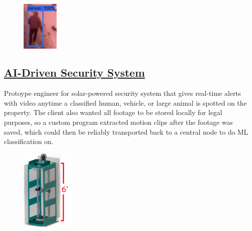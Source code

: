 \documentclass[
	10pt, %
]{FreemanCV}
\begin{document}
\begin{paracol}{2}

\setlength\intextsep{20pt} %
\begin{figure} %
    \includegraphics[width=50pt]{security_system} %
\end{figure}

\leavevmode \subsection{\href{https://github.com/jfcbooth/security_system}{AI-Driven Security System \scriptsize\faLink}}

Protoype engineer for solar-powered security system that gives real-time alerts with video anytime a classified human, vehicle, or large animal is spotted
on the property. The client also wanted all footage to be stored locally for legal purposes, so a custom program extracted motion clips
after the footage was saved, which could then be reliably transported back to a central node to do ML classification on.


\setlength\intextsep{7pt} %
\begin{figure} %
	\hspace*{-23pt} %
    \includegraphics[width=75pt]{printer} %
\end{figure}


\end{paracol}
\end{document}
